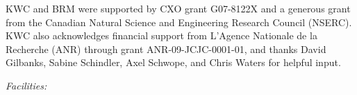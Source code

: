 \documentclass[iop]{emulateapj}
\begin{document}
\acknowledgements

KWC and BRM were supported by CXO grant G07-8122X and a generous grant
from the Canadian Natural Science and Engineering Research Council
(NSERC). KWC also acknowledges financial support from L'Agence
Nationale de la Recherche (ANR) through grant ANR-09-JCJC-0001-01, and
thanks David Gilbanks, Sabine Schindler, Axel Schwope, and Chris
Waters for helpful input.


{\it Facilities:}  





\clearpage






\end{document}
